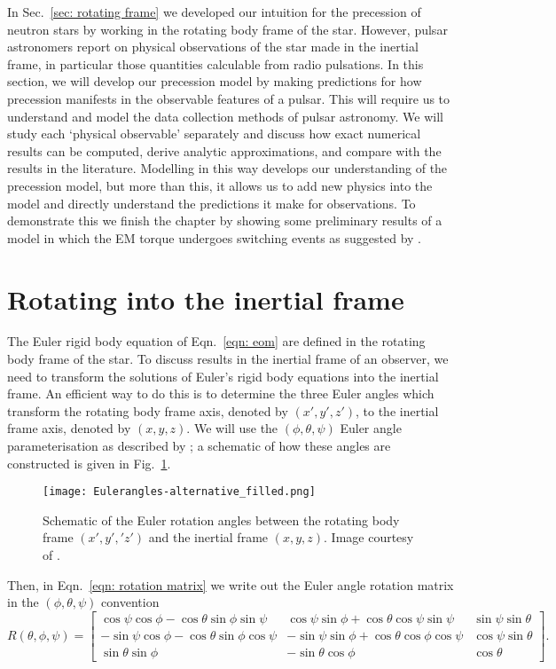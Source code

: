 \documentclass[../full_thesis/full_thesis.tex]{subfiles}
\begin{document}
In Sec.~\ref{sec: rotating frame} we developed our intuition for the precession
of neutron stars by working in the rotating body frame of the star.  However,
pulsar astronomers report on physical observations of the star made in the
inertial frame, in particular those quantities calculable from radio
pulsations. In this section, we will develop our precession model by making
predictions for how precession manifests in the observable features of a
pulsar. This will require us to understand and model the data collection
methods of pulsar astronomy. We will study each `physical observable' separately
and discuss how exact numerical results can be computed, derive analytic
approximations, and compare with the results in the literature.
Modelling in this way develops our understanding of the precession model, but
more than this, it allows us to add new physics into the model and directly
understand the predictions it make for observations. To demonstrate this we
finish the chapter by showing some preliminary results of a model in which the
EM torque undergoes switching events as suggested by \citet{Lyne2010}.

\section{Rotating into the inertial frame}

The Euler rigid body equation of Eqn.~\eqref{eqn: eom} are defined in the
rotating body frame of the star. To discuss results in the inertial frame of an
observer, we need to transform the solutions of Euler's rigid body equations
into the inertial frame.  An efficient way to do this is to determine the three
Euler angles which transform the rotating body frame axis, denoted by $(x',y',
z')$, to the inertial frame axis, denoted by $(x, y, z)$. We will use the
$(\phi, \theta, \psi)$ Euler
angle parameterisation as described by \citet{Landau1969}; a schematic of how
these angles are constructed is given in Fig.~\ref{fig: Euler}.
\begin{figure}[ht]
\centering
\texttt{[image: Eulerangles-alternative\_filled.png]}
\caption{Schematic of the Euler rotation angles between the rotating body
frame $(x', y', 'z')$ and the inertial frame $(x, y, z)$. Image courtesy of
 \citet{WikipediaEuler}.}
\label{fig: Euler}
\end{figure}
Then, in Eqn.~\eqref{eqn: rotation matrix} we write out the Euler angle
rotation matrix in the $(\phi, \theta, \psi)$ convention
\begin{equation}
R(\theta, \phi, \psi) = \left[
\begin{array}{ccc}
\cos\psi \cos\phi - \cos\theta \sin\phi \sin \psi &
\cos\psi \sin \phi + \cos\theta \cos \psi \sin \psi &
\sin \psi \sin\theta \\
-\sin\psi \cos\phi - \cos\theta\sin\phi\cos\psi &
-\sin\psi\sin\phi + \cos\theta\cos\phi\cos\psi &
\cos\psi \sin\theta \\
\sin\theta\sin\phi &
-\sin\theta \cos\phi &
\cos\theta
\end{array}
\right].
\label{eqn: rotation matrix}
\end{equation}
\end{document}
